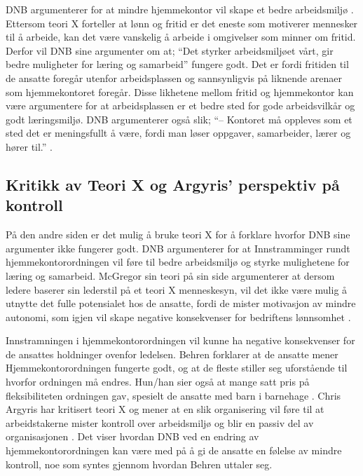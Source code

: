 DNB argumenterer for at mindre hjemmekontor vil skape et bedre arbeidsmiljø \parencite{biernat2026}. Ettersom teori X forteller at lønn og fritid er det eneste som motiverer mennesker til å arbeide, kan det være vanskelig å arbeide i omgivelser som minner om fritid. Derfor vil DNB sine argumenter om at; \enquote{Det styrker arbeidsmiljøet vårt, gir bedre muligheter for læring og samarbeid} \parencite{biernat2026} fungere godt. Det er fordi fritiden til de ansatte foregår utenfor arbeidsplassen og sannsynligvis på liknende arenaer som hjemmekontoret foregår. Disse likhetene mellom fritid og hjemmekontor kan være argumentere for at arbeidsplassen er et bedre sted for gode arbeidsvilkår og godt læringsmiljø. DNB argumenterer også slik; \enquote{-- Kontoret må oppleves som et sted det er meningsfullt å være, fordi man løser oppgaver, samarbeider, lærer og hører til.} \parencite{biernat2026}.

\subsection{Kritikk av Teori X og Argyris' perspektiv på kontroll}

På den andre siden er det mulig å bruke teori X for å forklare hvorfor DNB sine argumenter ikke fungerer godt. DNB argumenterer for at Innstramminger rundt hjemmekontorordningen vil føre til bedre arbeidsmiljø og styrke mulighetene for læring og samarbeid. McGregor sin teori på sin side argumenterer at dersom ledere baserer sin lederstil på et teori X menneskesyn, vil det ikke være mulig å utnytte det fulle potensialet hos de ansatte, fordi de mister motivasjon av mindre autonomi, som igjen vil skape negative konsekvenser for bedriftens lønnsomhet \parencite[s.~427]{einarsen2023}.

Innstramningen i hjemmekontorordningen vil kunne ha negative konsekvenser for de ansattes holdninger ovenfor ledelsen. Behren forklarer at de ansatte mener Hjemmekontorordningen fungerte godt, og at de fleste stiller seg uforstående til hvorfor ordningen må endres. Hun/han sier også at mange satt pris på fleksibiliteten ordningen gav, spesielt de ansatte med barn i barnehage \parencite{biernat2026}. Chris Argyris har kritisert teori X og mener at en slik organisering vil føre til at arbeidstakerne mister kontroll over arbeidsmiljø og blir en passiv del av organisasjonen \parencite[s.~427]{einarsen2023}. Det viser hvordan DNB ved en endring av hjemmekontorordningen kan være med på å gi de ansatte en følelse av mindre kontroll, noe som syntes gjennom hvordan Behren uttaler seg.

